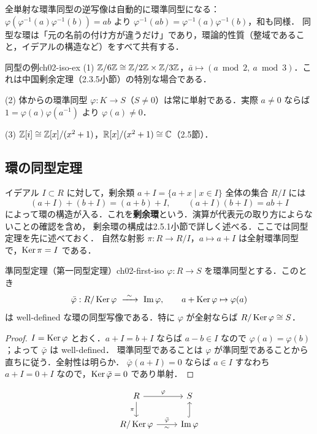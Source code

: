 全単射な環準同型の逆写像は自動的に環準同型になる：$\varphi(\varphi^{-1}(a)\varphi^{-1}(b))=ab$ より $\varphi^{-1}(ab)=\varphi^{-1}(a)\varphi^{-1}(b)$，和も同様．
同型な環は「元の名前の付け方が違うだけ」であり，環論的性質（整域であること，イデアルの構造など）をすべて共有する．

\begin{myex}{同型の例}{ch02-iso-ex}
(1) $\mathbb{Z}/6\mathbb{Z}\cong\mathbb{Z}/2\mathbb{Z}\times\mathbb{Z}/3\mathbb{Z}$，$\bar a\mapsto(a\bmod 2,\ a\bmod 3)$．これは中国剰余定理（2.3.5小節）の特別な場合である．

(2) 体からの環準同型 $\varphi:K\to S$（$S\ne0$）は常に単射である．実際 $a\ne0$ ならば $1=\varphi(a)\varphi(a^{-1})$ より $\varphi(a)\ne0$．

(3) $\mathbb{Z}[i]\cong\mathbb{Z}[x]/(x^2+1)$，$\mathbb{R}[x]/(x^2+1)\cong\mathbb{C}$（2.5節）．
\end{myex}

\subsection{環の同型定理}

イデアル $I\subset R$ に対して，剰余類 $a+I=\{a+x\mid x\in I\}$ 全体の集合 $R/I$ には
\[
  (a+I)+(b+I)=(a+b)+I,\qquad (a+I)(b+I)=ab+I
\]
によって環の構造が入る．これを\textbf{剰余環}という．演算が代表元の取り方によらないことの確認を含め，
剰余環の構成は2.5.1小節で詳しく述べる．ここでは同型定理を先に述べておく．
自然な射影 $\pi:R\to R/I$，$a\mapsto a+I$ は全射環準同型で，$\operatorname{Ker}\pi=I$ である．

\begin{mythm}{準同型定理（第一同型定理）}{ch02-first-iso}
$\varphi:R\to S$ を環準同型とする．このとき
\[
  \bar\varphi:R/\Ker\varphi\ \xrightarrow{\ \sim\ }\ \Img\varphi,\qquad a+\Ker\varphi\mapsto\varphi(a)
\]
は well-defined な環の同型写像である．特に $\varphi$ が全射ならば $R/\operatorname{Ker}\varphi\cong S$．
\end{mythm}

\begin{proof}
$I=\operatorname{Ker}\varphi$ とおく．$a+I=b+I$ ならば $a-b\in I$ なので $\varphi(a)=\varphi(b)$；よって $\bar\varphi$ は well-defined．
環準同型であることは $\varphi$ が準同型であることから直ちに従う．全射性は明らか．
$\bar\varphi(a+I)=0$ ならば $a\in I$ すなわち $a+I=0+I$ なので，$\operatorname{Ker}\bar\varphi=0$ であり単射．
\end{proof}

\[
\begin{tikzcd}
  R \arrow[r,"\varphi"] \arrow[d,"\pi"'] & S\\
  R/\Ker\varphi \arrow[r,"\bar\varphi","\sim"'] & \Img\varphi \arrow[u,hook]
\end{tikzcd}
\]

